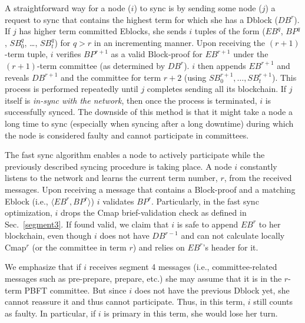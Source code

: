 A straightforward way for a node ($i$) to sync is by sending some node ($j$) a request to sync that contains the highest term for which she has a Dblock ($DB^r$). If $j$ has higher term committed Eblocks, she sends $i$ tuples of the form ($EB^q$, $BP^q$, $SB^q_0$, \dots, $SB^q_t$) for $q>r$ in an incrementing manner. Upon receiving the $(r+1)$-term tuple, $i$ verifies $BP^{r+1}$ as a valid Block-proof for $EB^{r+1}$ under the $(r+1)$-term committee (as determined by $DB^r$). $i$ then appends $EB^{r+1}$ and reveals $DB^{r+1}$ and the committee for term $r+2$ (using $SB^{r+1}_0, \dots , SB^{r+1}_t$). This process is performed repeatedly until $j$ completes sending all its blockchain. If $j$ itself is \emph{in-sync with the network}, then once the process is terminated, $i$ is successfully synced.
The downside of this method is that it might take a node a long time to sync (especially when syncing after a long downtime) during which the node is considered faulty and cannot participate in committees.

The \name fast sync algorithm enables a node to actively participate while the previously described syncing procedure is taking place. A node $i$ constantly listens to the network and learns the current term number, $r$, from the received messages. Upon receiving a message that contains a Block-proof and a matching Eblock (i.e., $\langle EB^r, BP^r\rangle$) $i$ validates $BP^r$. Particularly, in the fast sync optimization, $i$ drops the Cmap brief-validation check as defined in Sec.~\ref{segment3}. If found valid, we claim that $i$ is safe to append $EB^r$ to her blockchain, even though $i$ does not have $DB^{r-1}$ and can not calculate locally Cmap$^r$ (or the committee in term $r$) and relies on $EB^r$'s header for it. 

We emphasize that if $i$ receives segment 4 messages (i.e., committee-related messages such as pre-prepare, prepare, etc.) she may assume that it is in the $r$-term PBFT committee. But since $i$ does not have the previous Dblock yet, she cannot reassure it and thus cannot participate. Thus, in this term, $i$ still counts as faulty. In particular, if $i$ is primary in this term, she would lose her turn.

